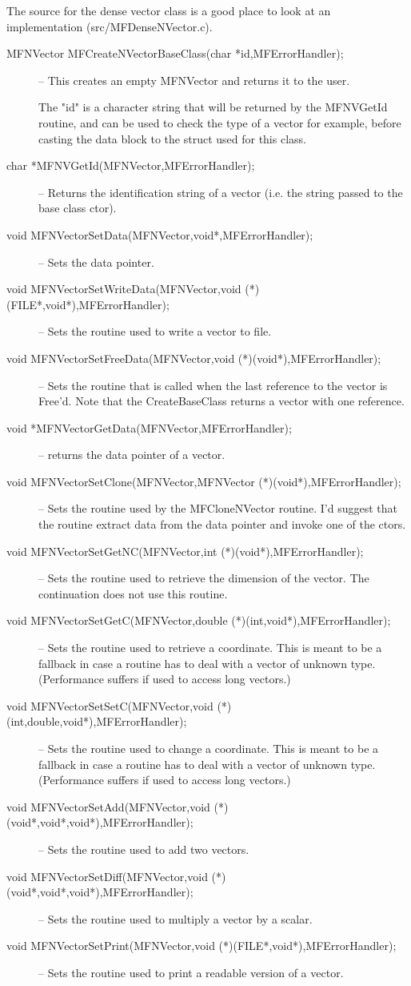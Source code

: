 \documentclass[12pt]{article}
\begin{document}
The source for the dense vector class is a good place to look at an implementation 
({src/MFDenseNVector.c}).
\begin{description}
\item [MFNVector MFCreateNVectorBaseClass(char *id,MFErrorHandler);] --
 This creates an empty MFNVector and returns it to the user.

 The "id" is a character string
 that will be returned by the {MFNVGetId} routine, and can be used to check the type
 of a vector for example, before casting the data block to the struct used for this class.
\item [char *MFNVGetId(MFNVector,MFErrorHandler);]
-- Returns the identification string of a vector (i.e. the string passed to the base class ctor).
\item [void MFNVectorSetData(MFNVector,void*,MFErrorHandler);] -- Sets the data pointer.
\item [void MFNVectorSetWriteData(MFNVector,void (*)(FILE*,void*),MFErrorHandler);] -- Sets the routine used to
write a vector to file.
\item [void MFNVectorSetFreeData(MFNVector,void (*)(void*),MFErrorHandler);] -- Sets the 
 routine that is called when the last reference to the vector is Free'd.
 Note that the {CreateBaseClass} returns a vector with one reference.
\item [void *MFNVectorGetData(MFNVector,MFErrorHandler);] -- returns the data pointer of a vector.
\item [void MFNVectorSetClone(MFNVector,MFNVector (*)(void*),MFErrorHandler);] -- Sets the routine
used by the {MFCloneNVector} routine. I'd suggest that the routine extract data from the
data pointer and invoke one of the ctors.
\item [void MFNVectorSetGetNC(MFNVector,int (*)(void*),MFErrorHandler);] -- Sets the routine used to retrieve
the dimension of the vector. The continuation does not use this routine.
\item [void MFNVectorSetGetC(MFNVector,double (*)(int,void*),MFErrorHandler);]-- Sets the routine used to retrieve
a coordinate. This is meant to be a fallback in case a routine has to deal with a vector of unknown
type. (Performance suffers if used to access long vectors.)
\item [void MFNVectorSetSetC(MFNVector,void (*)(int,double,void*),MFErrorHandler);]-- Sets the routine used to change
a coordinate. This is meant to be a fallback in case a routine has to deal with a vector of unknown
type. (Performance suffers if used to access long vectors.)
\item [void MFNVectorSetAdd(MFNVector,void (*)(void*,void*,void*),MFErrorHandler);] -- Sets the routine used to
add two vectors.
\item [void MFNVectorSetDiff(MFNVector,void (*)(void*,void*,void*),MFErrorHandler);] -- Sets the routine used to
multiply a vector by a scalar.
\item [void MFNVectorSetPrint(MFNVector,void (*)(FILE*,void*),MFErrorHandler);] -- Sets the routine used to
print a readable version of a vector.
\end{description}
\end{document}
